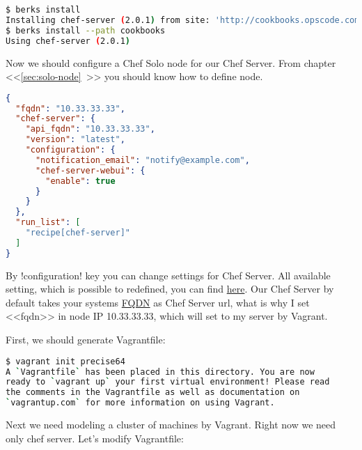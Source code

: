 \begin{lstlisting}[language=Bash,label=lst:my-server-cloud-installation3]
$ berks install
Installing chef-server (2.0.1) from site: 'http://cookbooks.opscode.com/api/v1/cookbooks'
$ berks install --path cookbooks
Using chef-server (2.0.1)
\end{lstlisting}

Now we should configure a Chef Solo node for our Chef Server. From chapter <<\ref{sec:solo-node}~>> you should know how to define node.

\begin{lstlisting}[language=JSON,label=lst:my-server-cloud-installation4,title=my-server-cloud/nodes/chef-server.example.com.json]
{
  "fqdn": "10.33.33.33",
  "chef-server": {
    "api_fqdn": "10.33.33.33",
    "version": "latest",
    "configuration": {
      "notification_email": "notify@example.com",
      "chef-server-webui": {
        "enable": true
      }
    }
  },
  "run_list": [
    "recipe[chef-server]"
  ]
}
\end{lstlisting}

By \inline!configuration! key you can change settings for Chef Server. All available setting, which is possible to redefined, you can find \href{https://github.com/opscode/omnibus-chef-server/blob/master/files/chef-server-cookbooks/chef-server/attributes/default.rb}{here}. Our Chef Server by default takes your systems \href{http://en.wikipedia.org/wiki/Fully\_qualified\_domain\_name}{FQDN} as Chef Server url, what is why I set <<fqdn>> in node IP 10.33.33.33, which will set to my server by Vagrant.

First, we should generate Vagrantfile:

\begin{lstlisting}[language=Bash,label=lst:my-server-cloud-installation5]
$ vagrant init precise64
A `Vagrantfile` has been placed in this directory. You are now
ready to `vagrant up` your first virtual environment! Please read
the comments in the Vagrantfile as well as documentation on
`vagrantup.com` for more information on using Vagrant.
\end{lstlisting}

Next we need modeling a cluster of machines by Vagrant. Right now we need only chef server. Let's modify Vagrantfile:

